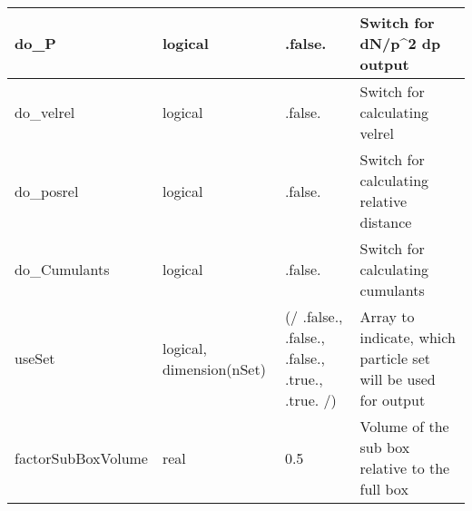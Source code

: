 \documentclass{article}
\begin{document}
\begin{longtable}{llll}
\midrule
do\_P & \begin{minipage}[t]{2cm}logical\end{minipage} & \begin{minipage}[t]{2cm}.false.\end{minipage} & \begin{minipage}[t]{12cm}Switch for dN/p\^{}2 dp output\end{minipage}\\*
\midrule
do\_velrel & \begin{minipage}[t]{2cm}logical\end{minipage} & \begin{minipage}[t]{2cm}.false.\end{minipage} & \begin{minipage}[t]{12cm}Switch for calculating velrel\end{minipage}\\*
\midrule
do\_posrel & \begin{minipage}[t]{2cm}logical\end{minipage} & \begin{minipage}[t]{2cm}.false.\end{minipage} & \begin{minipage}[t]{12cm}Switch for calculating relative distance\end{minipage}\\*
\midrule
do\_Cumulants & \begin{minipage}[t]{2cm}logical\end{minipage} & \begin{minipage}[t]{2cm}.false.\end{minipage} & \begin{minipage}[t]{12cm}Switch for calculating cumulants\end{minipage}\\*
\midrule
useSet & \begin{minipage}[t]{2cm}logical, dimension(nSet)\end{minipage} & \begin{minipage}[t]{2cm}(/ .false., .false., .false., .true., .true. /)\end{minipage} & \begin{minipage}[t]{12cm}Array to indicate, which particle set will be used for output\end{minipage}\\*
\midrule
factorSubBoxVolume & \begin{minipage}[t]{2cm}real\end{minipage} & \begin{minipage}[t]{2cm}0.5\end{minipage} & \begin{minipage}[t]{12cm}Volume of the sub box relative to the full box\end{minipage}\\*

\end{longtable}
\end{document}
